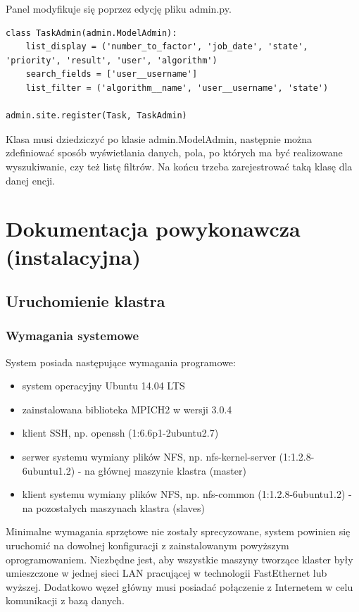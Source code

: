 \documentclass{article}
\begin{document}
Panel modyfikuje się poprzez edycję pliku admin.py.

\begin{lstlisting}
class TaskAdmin(admin.ModelAdmin):
    list_display = ('number_to_factor', 'job_date', 'state', 'priority', 'result', 'user', 'algorithm')
    search_fields = ['user__username']
    list_filter = ('algorithm__name', 'user__username', 'state')

admin.site.register(Task, TaskAdmin)
\end{lstlisting}

Klasa musi dziedziczyć po klasie admin.ModelAdmin, następnie można zdefiniować sposób wyświetlania danych, pola, po których ma być realizowane wyszukiwanie, czy też listę filtrów. Na końcu trzeba zarejestrować taką klasę dla danej encji.

\section{Dokumentacja powykonawcza (instalacyjna)}

\subsection{Uruchomienie klastra}
\subsubsection{Wymagania systemowe}

System posiada następujące wymagania programowe:
\begin{itemize}
\item system operacyjny Ubuntu 14.04 LTS
\item zainstalowana biblioteka MPICH2 w wersji 3.0.4
\item klient SSH, np. openssh (1:6.6p1-2ubuntu2.7)
\item serwer systemu wymiany plików NFS, np. nfs-kernel-server (1:1.2.8-6ubuntu1.2) - na głównej maszynie klastra (master)
\item klient systemu wymiany plików NFS, np. nfs-common (1:1.2.8-6ubuntu1.2) - na pozostałych maszynach klastra (slaves)
\end{itemize}
 
Minimalne wymagania sprzętowe nie zostały sprecyzowane, system powinien się uruchomić na dowolnej konfiguracji z zainstalowanym powyższym oprogramowaniem. Niezbędne jest, aby wszystkie maszyny tworzące klaster były umieszczone w jednej sieci LAN pracującej w technologii FastEthernet lub wyższej. Dodatkowo węzeł główny musi posiadać połączenie z Internetem w celu komunikacji z bazą danych.
\end{document}
